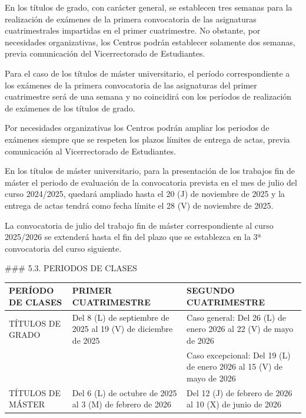 \documentclass{article}
\begin{document}
\begin{itemize}
\begin{itemize}
\begin{scriptsize}
                  En los títulos de grado, con carácter general, se establecen tres semanas para la realización de exámenes de la primera convocatoria de las asignaturas cuatrimestrales impartidas en el primer cuatrimestre. No obstante, por necesidades organizativas, los Centros podrán establecer solamente dos semanas, previa comunicación del Vicerrectorado de Estudiantes.

                  Para el caso de los títulos de máster universitario, el período correspondiente a los exámenes de la primera convocatoria de las asignaturas del primer cuatrimestre será de una semana y no coincidirá con los períodos de realización de exámenes de los títulos de grado.

                  Por necesidades organizativas los Centros podrán ampliar los periodos de exámenes siempre que se respeten los plazos límites de entrega de actas, previa comunicación al Vicerrectorado de Estudiantes.

                  En los títulos de máster universitario, para la presentación de los trabajos fin de máster el periodo de evaluación de la convocatoria prevista en el mes de julio del curso 2024/2025, quedará ampliado hasta el 20 (J) de noviembre de 2025 y la entrega de actas tendrá como fecha límite el 28 (V) de noviembre de 2025.

                  La convocatoria de julio del trabajo fin de máster correspondiente al curso 2025/2026 se extenderá hasta el fin del plazo que se establezca en la 3ª convocatoria del curso siguiente.

                  \#\#\# 5.3. PERIODOS DE CLASES

                  \vspace{0.4cm}
                  \begin{table}[h!]\centering\renewcommand{\arraystretch}{1.3}
                    \begin{tabular}{|p{}|p{}|p{}|}\hline
                      PERÍODO DE CLASES & PRIMER CUATRIMESTRE                                            & SEGUNDO CUATRIMESTRE                                                 \\\hline
                      TÍTULOS DE GRADO  & Del 8 (L) de septiembre de 2025 al 19 (V) de diciembre de 2025 & Caso general: Del 26 (L) de enero 2026 al 22 (V) de mayo de 2026     \\\hline
                                        &                                                                & Caso excepcional: Del 19 (L) de enero 2026 al 15 (V) de mayo de 2026 \\\hline
                      TÍTULOS DE MÁSTER & Del 6 (L) de octubre de 2025 al 3 (M) de febrero de 2026       & Del 12 (J) de febrero de 2026 al 10 (X) de junio de 2026             \\\hline
                    \end{tabular}\end{table}
                  \vspace{0.4cm}


\end{scriptsize}
\end{itemize}
\end{itemize}
\end{document}
